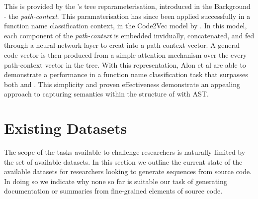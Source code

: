 This is provided by the \citet{alon_general_2018}'s tree reparameterisation, introduced in the Background - the \textit{path-context}.
This paramaterisation has since been applied successfully in a function name classification context, in the Code2Vec model by \citep{alon_code2vec_2018}.
In this model, each component of the \textit{path-context} is embedded invidually, concatenated, and fed through a neural-network layer to creat into a path-context vector.
A general code vector is then produced from a simple attention mechanism over the every path-context vector in the tree. 
With this representation, Alon et al are able to demonstrate a performance in a function name classification task that surpasses both \citet{allamanis_convolutional_2016} and \citet{iyer_summarizing_2016}. This simplicity and proven effectiveness demonstrate an appealing approach to capturing semantics within the structure of with AST.

\section{Existing Datasets}
\label{sec:existing_datasets}

The scope of the tasks available to challenge researchers is naturally limited by the set of available datasets.
In this section we outline the current state of the available datasets for researchers looking to generate sequences from source code. In doing so we indicate why none so far is suitable our task of generating documentation or summaries from fine-grained elements of source code.

